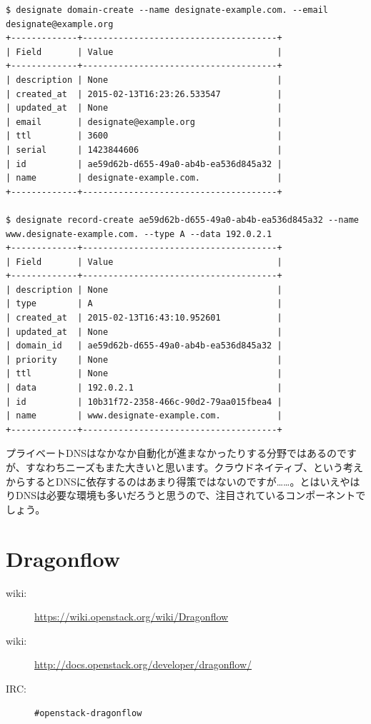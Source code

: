 \begin{lstlisting}
$ designate domain-create --name designate-example.com. --email designate@example.org
+-------------+--------------------------------------+
| Field       | Value                                |
+-------------+--------------------------------------+
| description | None                                 |
| created_at  | 2015-02-13T16:23:26.533547           |
| updated_at  | None                                 |
| email       | designate@example.org                |
| ttl         | 3600                                 |
| serial      | 1423844606                           |
| id          | ae59d62b-d655-49a0-ab4b-ea536d845a32 |
| name        | designate-example.com.               |
+-------------+--------------------------------------+

$ designate record-create ae59d62b-d655-49a0-ab4b-ea536d845a32 --name www.designate-example.com. --type A --data 192.0.2.1
+-------------+--------------------------------------+
| Field       | Value                                |
+-------------+--------------------------------------+
| description | None                                 |
| type        | A                                    |
| created_at  | 2015-02-13T16:43:10.952601           |
| updated_at  | None                                 |
| domain_id   | ae59d62b-d655-49a0-ab4b-ea536d845a32 |
| priority    | None                                 |
| ttl         | None                                 |
| data        | 192.0.2.1                            |
| id          | 10b31f72-2358-466c-90d2-79aa015fbea4 |
| name        | www.designate-example.com.           |
+-------------+--------------------------------------+
\end{lstlisting}

プライベートDNSはなかなか自動化が進まなかったりする分野ではあるのですが、すなわちニーズもまた大きいと思います。クラウドネイティブ、という考えからするとDNSに依存するのはあまり得策ではないのですが……。とはいえやはりDNSは必要な環境も多いだろうと思うので、注目されているコンポーネントでしょう。

\section{Dragonflow}

\begin{description}
	\item[wiki:] \url{https://wiki.openstack.org/wiki/Dragonflow}
	\item[wiki:] \url{http://docs.openstack.org/developer/dragonflow/}
	\item[IRC:] \verb|#openstack-dragonflow|
\end{description}

